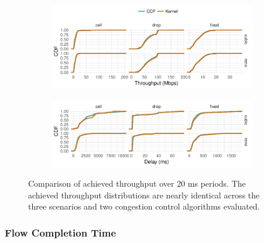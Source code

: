 \begin{figure}[t]
\centering
\begin{subfigure}{\columnwidth}
\includegraphics[width=\columnwidth]{img/throughput-cdf}
\label{fig:eval:fidelity:tput-cdf}
\end{subfigure}
%
\begin{subfigure}{\columnwidth}
\includegraphics[width=\columnwidth]{img/delay-cdf}
\label{fig:eval:fidelity:delay-cdf}
\end{subfigure}
%
\caption{Comparison of achieved throughput over 20 ms periods. The achieved throughput distributions are nearly identical across the three scenarios and two congestion control algorithms evaluated.}\label{fig:eval:fidelity:cdfs}
\end{figure}

\subsubsection{Flow Completion Time}
\label{sec:eval:fidelity:fct}

